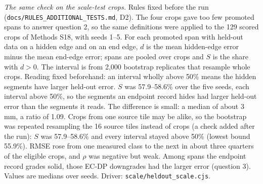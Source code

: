 \documentclass[11pt]{article}
\begin{document}
\vspace{4mm}
\noindent\emph{The same check on the scale-test crops.} Rules fixed before the run (\texttt{docs/\allowbreak RULES\_\allowbreak ADDITIONAL\_\allowbreak TESTS.md}, D2). The four crops gave too few promoted spans to answer question 2, so the same definitions were applied to the 129 scored crops of Methods S18, with seeds 1--5. For each promoted span with held-out data on a hidden edge and on an end edge, $d$ is the mean hidden-edge error minus the mean end-edge error; spans are pooled over crops and $S$ is the share with $d>0$. The interval is from 2{,}000 bootstrap replicates that resample whole crops. Reading fixed beforehand: an interval wholly above 50\% means the hidden segments have larger held-out error. $S$ was 57.9--58.6\% over the five seeds, each interval above 50\%, so the segments an endpoint record hides had larger held-out error than the segments it reads. The difference is small: a median of about 3 mm, a ratio of 1.09. Crops from one source tile may be alike, so the bootstrap was repeated resampling the 16 source tiles instead of crops (a check added after the run): $S$ was 57.9--58.6\% and every interval stayed above 50\% (lowest bound 55.9\%). RMSE rose from one measured class to the next in about three quarters of the eligible crops, and $\rho$ was negative but weak. Among spans the endpoint record grades solid, those EC-DP downgrades had the larger error (question 3). Values are medians over seeds. Driver: \texttt{scale/heldout\_scale.cjs}.

\begin{center}\scriptsize
{}
\end{center}
\end{document}
